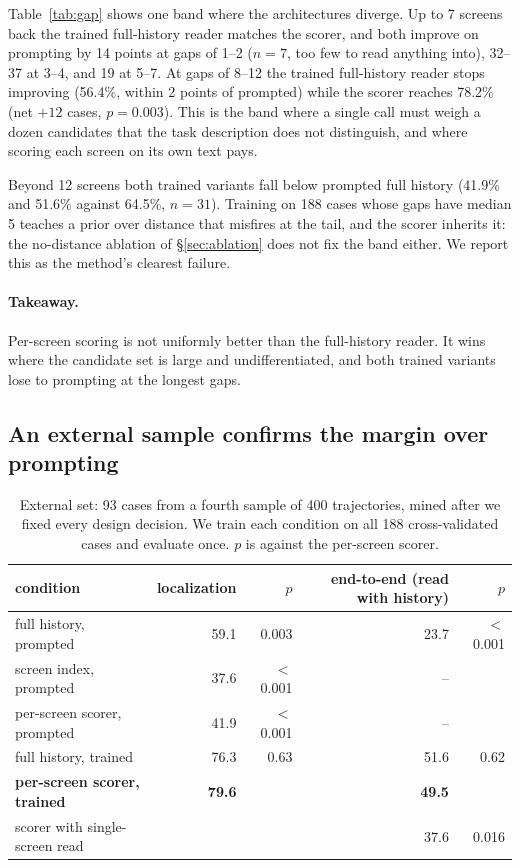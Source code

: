 Table~\ref{tab:gap} shows one band where the architectures diverge. Up to 7 screens back the trained full-history reader matches the scorer, and both improve on prompting by 14 points at gaps of 1--2 ($n=7$, too few to read anything into), 32--37 at 3--4, and 19 at 5--7. At gaps of 8--12 the trained full-history reader stops improving (56.4\%, within 2 points of prompted) while the scorer reaches 78.2\% (net $+12$ cases, $p=0.003$). This is the band where a single call must weigh a dozen candidates that the task description does not distinguish, and where scoring each screen on its own text pays.

Beyond 12 screens both trained variants fall below prompted full history (41.9\% and 51.6\% against 64.5\%, $n=31$). Training on 188 cases whose gaps have median 5 teaches a prior over distance that misfires at the tail, and the scorer inherits it: the no-distance ablation of \S\ref{sec:ablation} does not fix the band either. We report this as the method's clearest failure.

\paragraph{Takeaway.} Per-screen scoring is not uniformly better than the full-history reader. It wins where the candidate set is large and undifferentiated, and both trained variants lose to prompting at the longest gaps.

\subsection{An external sample confirms the margin over prompting}
\label{sec:ext}
\begin{table}[t]
\centering\scriptsize
\caption{External set: 93 cases from a fourth sample of 400 trajectories, mined after we fixed every design decision. We train each condition on all 188 cross-validated cases and evaluate once. $p$ is against the per-screen scorer.}
\label{tab:ext}
\begin{tabular}{lrrrr}
\toprule
condition & localization & $p$ & end-to-end (read with history) & $p$ \\
\midrule
full history, prompted & 59.1 & 0.003 & 23.7 & $<$0.001 \\
screen index, prompted & 37.6 & $<$0.001 & -- & \\
per-screen scorer, prompted & 41.9 & $<$0.001 & -- & \\
full history, trained & 76.3 & 0.63 & 51.6 & 0.62 \\
\textbf{per-screen scorer, trained} & \textbf{79.6} & & \textbf{49.5} & \\
\quad scorer with single-screen read & & & 37.6 & 0.016 \\
\bottomrule
\end{tabular}
\end{table}

